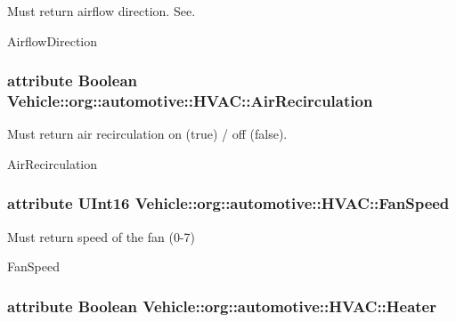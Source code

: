 Must return airflow direction. See. 

Airflow\-Direction \hypertarget{interfaceVehicle_1_1org_1_1automotive_1_1HVAC_a92454327ebb4aa3b466a6010ee2b31a2}{
\subsubsection[{Air\-Recirculation}]{\setlength{\rightskip}{0pt plus 5cm}attribute Boolean Vehicle\-::org\-::automotive\-::\-H\-V\-A\-C\-::\-Air\-Recirculation}}\label{interfaceVehicle_1_1org_1_1automotive_1_1HVAC_a92454327ebb4aa3b466a6010ee2b31a2}


Must return air recirculation on (true) / off (false). 

Air\-Recirculation \hypertarget{interfaceVehicle_1_1org_1_1automotive_1_1HVAC_a9d52d124320fbe9b20bacede256b73d4}{
\subsubsection[{Fan\-Speed}]{\setlength{\rightskip}{0pt plus 5cm}attribute U\-Int16 Vehicle\-::org\-::automotive\-::\-H\-V\-A\-C\-::\-Fan\-Speed}}\label{interfaceVehicle_1_1org_1_1automotive_1_1HVAC_a9d52d124320fbe9b20bacede256b73d4}


Must return speed of the fan (0-\/7) 

Fan\-Speed \hypertarget{interfaceVehicle_1_1org_1_1automotive_1_1HVAC_a30e22efdc969e620fb02045b46d2a967}{
\subsubsection[{Heater}]{\setlength{\rightskip}{0pt plus 5cm}attribute Boolean Vehicle\-::org\-::automotive\-::\-H\-V\-A\-C\-::\-Heater}}\label{interfaceVehicle_1_1org_1_1automotive_1_1HVAC_a30e22efdc969e620fb02045b46d2a967}



